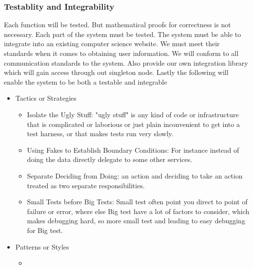 \subsubsection{Testablity and Integrability}
		Each function will be tested. But mathematical proofs for correctness is not necessary. Each part of the system must be tested. The system must be able to integrate into an existing computer science website. We must meet their standards when it comes to obtaining user information. We will conform to all communication standards to the system. Also provide our own integration library which will gain access through out singleton node. Lastly the following will enable the system to be both a testable and integrable
		\begin{itemize}
	\item{Tactics or Strategies}
		\begin{itemize}
			\item Isolate the Ugly Stuff: "ugly stuff" is any kind of code or infrastructure that is complicated or laborious or just plain inconvenient to get into a test harness, or that makes tests run very slowly.
			\item Using Fakes to Establish Boundary Conditions: For instance instead of doing the data directly delegate to some other services.
			\item Separate Deciding from Doing: an action and deciding to take an action treated as two separate responsibilities.
			\item Small Tests before Big Tests: Small test often point you direct to point of failure or error, where else Big test have a lot of factors to consider, which makes debugging hard, so more small test and leading to easy debugging for Big test.
		\end{itemize}
	\item{Patterns or Styles}
		\begin{itemize}
			\item
		\end{itemize}
\end{itemize}

%
